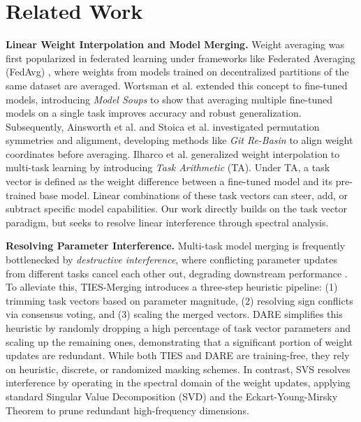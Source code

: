 \section{Related Work}
\label{sec:related_work}

\textbf{Linear Weight Interpolation and Model Merging.}
Weight averaging was first popularized in federated learning under frameworks like Federated Averaging (FedAvg) \cite{fedavg, fedavg2}, where weights from models trained on decentralized partitions of the same dataset are averaged. Wortsman et al. \cite{wortsman2022model} extended this concept to fine-tuned models, introducing \emph{Model Soups} to show that averaging multiple fine-tuned models on a single task improves accuracy and robust generalization. Subsequently, Ainsworth et al. \cite{ainsworth2022git} and Stoica et al. \cite{stoica2023zipit} investigated permutation symmetries and alignment, developing methods like \emph{Git Re-Basin} to align weight coordinates before averaging. Ilharco et al. \cite{ilharco2022editing} generalized weight interpolation to multi-task learning by introducing \emph{Task Arithmetic} (TA). Under TA, a task vector is defined as the weight difference between a fine-tuned model and its pre-trained base model. Linear combinations of these task vectors can steer, add, or subtract specific model capabilities. Our work directly builds on the task vector paradigm, but seeks to resolve linear interference through spectral analysis.

\textbf{Resolving Parameter Interference.}
Multi-task model merging is frequently bottlenecked by \emph{destructive interference}, where conflicting parameter updates from different tasks cancel each other out, degrading downstream performance \cite{yu2023language}. To alleviate this, TIES-Merging \cite{yadav2023ties} introduces a three-step heuristic pipeline: (1) trimming task vectors based on parameter magnitude, (2) resolving sign conflicts via consensus voting, and (3) scaling the merged vectors. DARE \cite{yu2023dare} simplifies this heuristic by randomly dropping a high percentage of task vector parameters and scaling up the remaining ones, demonstrating that a significant portion of weight updates are redundant. While both TIES and DARE are training-free, they rely on heuristic, discrete, or randomized masking schemes. In contrast, SVS resolves interference by operating in the spectral domain of the weight updates, applying standard Singular Value Decomposition (SVD) and the Eckart-Young-Mirsky Theorem to prune redundant high-frequency dimensions.

